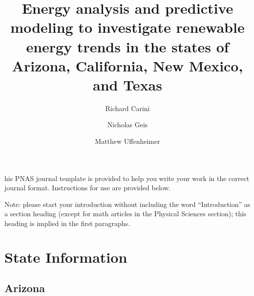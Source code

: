 \documentclass[9pt,twocolumn,twoside]{pnas-new}
\title{Energy analysis and predictive modeling to investigate renewable energy trends in the states of Arizona, California, New Mexico, and Texas }
\author{Richard Carini}
\author{Nicholas Geis}
\author{Matthew Uffenheimer}
\affil{University of California, Santa Barbara, Mathematics Department}
\begin{document}
\verticaladjustment{-2pt}

\maketitle
\thispagestyle{firststyle}

his PNAS journal template is provided to help you write your work in the correct journal format.  Instructions for use are provided below.

Note: please start your introduction without including the word ``Introduction'' as a section heading (except for math articles in the Physical Sciences section); this heading is implied in the first paragraphs. 

\section*{State Information}

\subsection*{Arizona}
\end{document}
